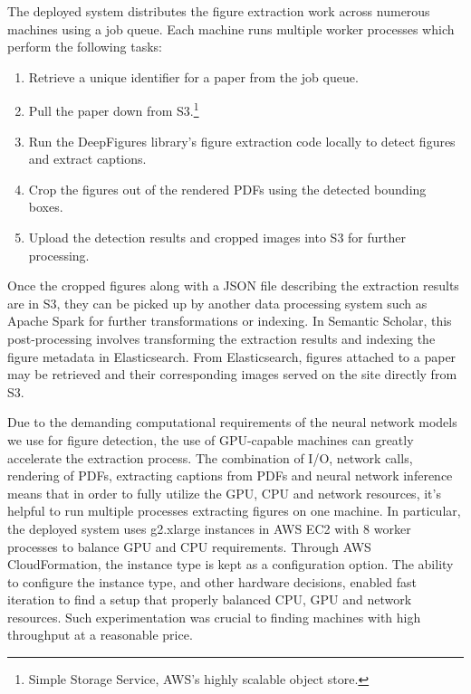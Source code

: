 \documentclass[sigconf]{acmart}
\begin{document}

The deployed system distributes the figure extraction work across numerous machines using a job queue. Each machine runs multiple worker processes which perform the following tasks:

\begin{enumerate}
  \item Retrieve a unique identifier for a paper from the job queue.
  \item Pull the paper down from S3.\footnote{Simple Storage Service, AWS's highly scalable object store.}
  \item Run the DeepFigures library's figure extraction code locally to detect figures and extract captions.
  \item Crop the figures out of the rendered PDFs using the detected bounding boxes.
  \item Upload the detection results and cropped images into S3 for further processing.
\end{enumerate}

Once the cropped figures along with a JSON file describing the extraction results are in S3, they can be picked up by another data processing system such as Apache Spark for further transformations or indexing. In Semantic Scholar, this post-processing involves transforming the extraction results and indexing the figure metadata in Elasticsearch. From Elasticsearch, figures attached to a paper may be retrieved and their corresponding images served on the site directly from S3.


Due to the demanding computational requirements of the neural network models we use for figure detection, the use of GPU-capable machines can greatly accelerate the extraction process. The combination of I/O, network calls, rendering of PDFs, extracting captions from PDFs and neural network inference means that in order to fully utilize the GPU, CPU and network resources, it's helpful to run multiple processes extracting figures on one machine. In particular, the deployed system uses g2.xlarge instances in AWS EC2 with 8 worker processes to balance GPU and CPU requirements. Through AWS CloudFormation, the instance type is kept as a configuration option. The ability to configure the instance type, and other hardware decisions, enabled fast iteration to find a setup that properly balanced CPU, GPU and network resources. Such experimentation was crucial to finding machines with high throughput at a reasonable price.
\end{document}
